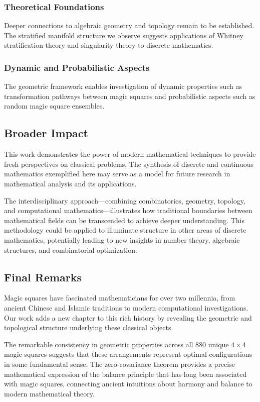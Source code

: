 \subsubsection{Theoretical Foundations}

Deeper connections to algebraic geometry and topology remain to be established. The stratified manifold structure we observe suggests applications of Whitney stratification theory and singularity theory to discrete mathematics.

\subsubsection{Dynamic and Probabilistic Aspects}

The geometric framework enables investigation of dynamic properties such as transformation pathways between magic squares and probabilistic aspects such as random magic square ensembles.

\subsection{Broader Impact}

This work demonstrates the power of modern mathematical techniques to provide fresh perspectives on classical problems. The synthesis of discrete and continuous mathematics exemplified here may serve as a model for future research in mathematical analysis and its applications.

The interdisciplinary approach—combining combinatorics, geometry, topology, and computational mathematics—illustrates how traditional boundaries between mathematical fields can be transcended to achieve deeper understanding. This methodology could be applied to illuminate structure in other areas of discrete mathematics, potentially leading to new insights in number theory, algebraic structures, and combinatorial optimization.

\subsection{Final Remarks}

Magic squares have fascinated mathematicians for over two millennia, from ancient Chinese and Islamic traditions to modern computational investigations. Our work adds a new chapter to this rich history by revealing the geometric and topological structure underlying these classical objects.

The remarkable consistency in geometric properties across all 880 unique $4 \times 4$ magic squares suggests that these arrangements represent optimal configurations in some fundamental sense. The zero-covariance theorem provides a precise mathematical expression of the balance principle that has long been associated with magic squares, connecting ancient intuitions about harmony and balance to modern mathematical theory.

